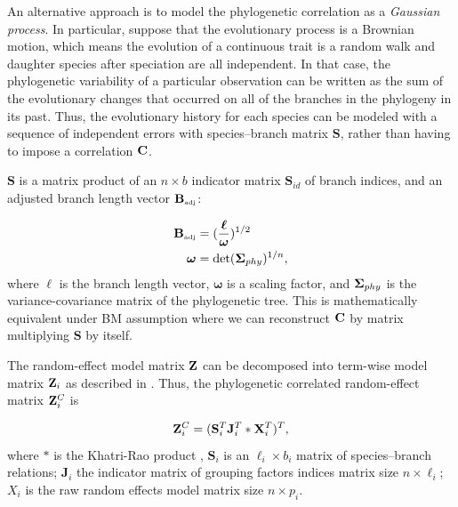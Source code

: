 \newcommand{\bS}{{\mathbf S}}
\newcommand{\bJ}{{\mathbf J}}
\newcommand{\bBadj}{{\mathbf B}_{\mbox{\tiny adj}}}
\newcommand{\bomega}{{\boldsymbol \omega}}
\newcommand{\bell}{{\boldsymbol \ell}}


An alternative approach is to model the phylogenetic correlation as a \textit{Gaussian process}. 
In particular, suppose that the evolutionary process is a Brownian motion, which means the evolution of a continuous trait is a random walk and daughter species after speciation are all independent.  
In that case, the phylogenetic variability of a particular observation can be written as the sum of the evolutionary changes that occurred on all of the branches in the phylogeny in its past. 
Thus, the evolutionary history for each species can be modeled with a sequence of independent errors with species--branch matrix $\bS$, rather than having to impose a correlation ${\mathbf C}$. 

$\bS$ is a matrix product of an $n \times b$ indicator matrix $\bS_{id}$ of branch indices, and an adjusted branch length vector $\bBadj$:

\begin{align}
\bBadj & = (\frac{\bell}{\bomega})^{1/2} \\
\bomega & = \textrm{det}(\bSigma_{phy})^{1/n},
\end{align}
where $\bell$ is the branch length vector, $\bomega$ is a scaling factor, and ${\boldsymbol \Sigma}_{phy}$ is the variance-covariance matrix of the phylogenetic tree.
This is mathematically equivalent under BM assumption where we can reconstruct ${\mathbf C}$ by matrix multiplying $\bS$ by itself.

The random-effect model matrix ${\mathbf Z}$ can be decomposed into term-wise model matrix ${\mathbf Z}_{i}$ as described in \citet{bates2015fitting}.
Thus, the phylogenetic correlated random-effect matrix ${\mathbf Z}^{C}_{i}$ is

\begin{equation}
\bZ^{C}_{i} = (\bS^{T}_{i}\bJ^{T}_{i} \ast \bX^{T}_{i})^{T}, \label{eq:ZC}
\end{equation}
where $\ast$ is the Khatri-Rao product \citep{khatri1968solutions}, $\bS_{i}$ is an $\ell_{i} \times b_{i}$ matrix of species--branch relations; $\bJ_{i}$ the indicator matrix of grouping factors indices matrix size $n \times \ell_{i}$; $X_{i}$ is the raw random effects model matrix size $n \times p_{i}$. 

